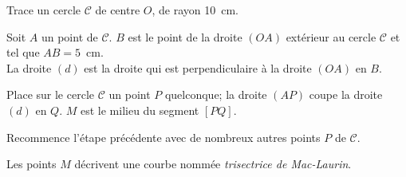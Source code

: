 
\begin{myenumerate}
  \item Trace un cercle $\mathscr C$ de centre $O$, de rayon 10~cm.%
  \item Soit $A$ un point de $\mathscr C$. $B$ est le point de la
    droite $(OA)$ extérieur au cercle $\mathscr  C$ et tel que
    $AB=5$~cm.\\%
    La droite $(d)$ est la droite qui est perpendiculaire à la droite
    $(OA)$ en $B$.
  \item Place sur le cercle $\mathscr C$ un point $P$ quelconque; la
    droite $(AP)$ coupe la droite $(d)$ en $Q$. $M$ est le milieu du
    segment $[PQ]$.
  \item Recommence l'étape précédente avec de nombreux autres points
    $P$ de $\mathscr C$.
\end{myenumerate}
Les points $M$ décrivent une courbe nommée {\em trisectrice de Mac-Laurin}.
